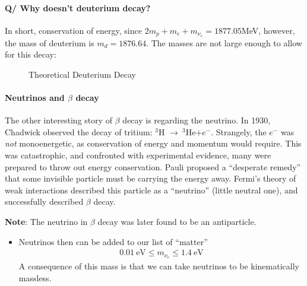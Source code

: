 \paragraph{Q/ Why doesn't deuterium decay?} In short, conservation of energy, since $2m_p+m_e+m_{\nu_e}=1877.05$MeV, however, the mass of deuterium is $m_d=1876.64$. The masses are not large enough to allow for this decay:
\begin{figure}[H]
  \centering
  \caption{Theoretical Deuterium Decay}
\end{figure}

\paragraph{Neutrinos and $\beta$ decay}
The other interesting story of $\beta$ decay is regarding the neutrino. In 1930, Chadwick observed the decay of tritium: $^3$H $\to\ ^3$He$+e^-$. Strangely, the $e^-$ was \emph{not} monoenergetic, as conservation of energy and momentum would require. This was catastrophic, and confronted with experimental evidence, many were prepared to throw out energy conservation. Pauli proposed a ``desperate remedy'' that some invisible particle must be carrying the energy away. Fermi's theory of weak interactions described this particle as a ``neutrino'' (little neutral one), and successfully described $\beta$ decay.

\textbf{Note}: The neutrino in $\beta$ decay was later found to be an antiparticle.

\begin{itemize}
\item Neutrinos then can be added to our list of ``matter''
  \begin{align*}
    \SI{0.01}{\eV}\leq m_{\nu_e}\leq\SI{1.4}{\eV}
  \end{align*}
  A consequence of this mass is that we can take neutrinos to be kinematically massless.
\end{itemize}

